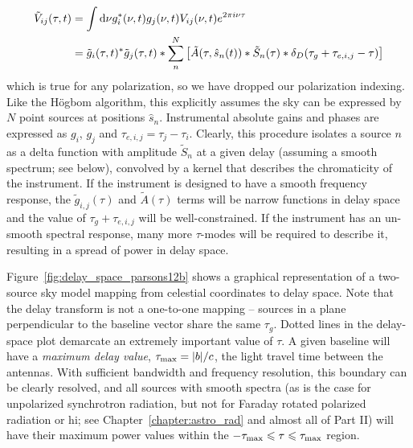 \begin{equation}
\begin{split}
\tilde{V}_{ij}(\tau, t) &= \int {\rm d}\nu g_i^*(\nu, t)g_j(\nu, t) V_{ij}(\nu,t)e^{2\pi i \nu \tau} \\
								   &= \tilde{g}_i(\tau, t)^*\tilde{g}_j(\tau, t) *
								   \sum_n^N \left[ \tilde{A}(\tau,\hat{s}_n(t)) * \tilde{S}_n(\tau) * \delta_D(\tau_g + \tau_{e,i,j} - \tau)\right]
\end{split}		   
\end{equation}
which is true for any polarization, so we have dropped our polarization indexing. Like the H{\"o}gbom algorithm, this explicitly assumes the sky can be expressed by $N$ point sources at positions $\hat{s}_n$. Instrumental absolute gains and phases are expressed as $g_i$, $g_j$ and $\tau_{e,i,j}= \tau_j - \tau_i$. Clearly, this procedure isolates a source $n$ as a delta function with amplitude $\tilde{S}_n$ at a given delay (assuming a smooth spectrum; see below), convolved by a kernel that describes the chromaticity of the instrument. If the instrument is designed to have a smooth frequency response, the $\tilde{g}_{i,j}(\tau)$ and $\tilde{A}(\tau)$ terms will be narrow functions in delay space and the value of $\tau_g + \tau_{e,i,j}$ will be well-constrained. If the instrument has an un-smooth spectral response, many more $\tau$-modes will be required to describe it, resulting in a spread of power in delay space. 

Figure~\ref{fig:delay_space_parsons12b} shows a graphical representation of a two-source sky model mapping from celestial coordinates to delay space. Note that the delay transform is not a one-to-one mapping -- sources in a plane perpendicular to the baseline vector share the same $\tau_g$. Dotted lines in the delay-space plot demarcate an extremely important value of $\tau$. A given baseline will have a \textit{maximum delay value}, $\tau_{\rm max} = |b|/c$, the light travel time between the antennas. With sufficient bandwidth and frequency resolution, this boundary can be clearly resolved, and all sources with smooth spectra (as is the case for unpolarized synchrotron radiation, but not for Faraday rotated polarized radiation or {\sc hi}; see Chapter~\ref{chapter:astro_rad} and almost all of Part II) will have their maximum power values within the $-\tau_{\rm max} \leqslant \tau \leqslant \tau_{\rm max}$ region.


